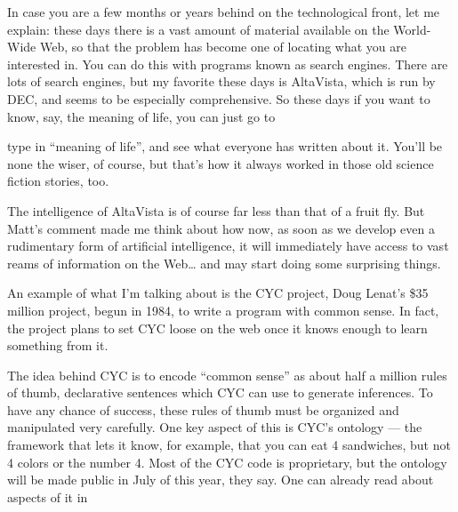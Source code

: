 \documentclass{article}
\def\tightlist{}
\renewcommand{\texttt}[1]{%
  \begingroup
  \ttfamily
  \begingroup\lccode`~=`/\lowercase{\endgroup\def~}{/\discretionary{}{}{}}%
  \begingroup\lccode`~=`[\lowercase{\endgroup\def~}{[\discretionary{}{}{}}%
  \begingroup\lccode`~=`.\lowercase{\endgroup\def~}{.\discretionary{}{}{}}%
  \catcode`/=\active\catcode`[=\active\catcode`.=\active
  \scantokens{#1\noexpand}%
  \endgroup
}
\begin{document}
In case you are a few months or years behind on the technological front,
let me explain: these days there is a vast amount of material available
on the World-Wide Web, so that the problem has become one of locating
what you are interested in. You can do this with programs known as
search engines. There are lots of search engines, but my favorite these
days is AltaVista, which is run by DEC, and seems to be especially
comprehensive. So these days if you want to know, say, the meaning of
life, you can just go to


type in ``meaning of life'', and see what everyone has written about it.
You'll be none the wiser, of course, but that's how it always worked in
those old science fiction stories, too.

The intelligence of AltaVista is of course far less than that of a fruit
fly. But Matt's comment made me think about how now, as soon as we
develop even a rudimentary form of artificial intelligence, it will
immediately have access to vast reams of information on the Web\ldots{}
and may start doing some surprising things.

An example of what I'm talking about is the CYC project, Doug Lenat's
\$35 million project, begun in 1984, to write a program with common
sense. In fact, the project plans to set CYC loose on the web once it
knows enough to learn something from it.


The idea behind CYC is to encode ``common sense'' as about half a
million rules of thumb, declarative sentences which CYC can use to
generate inferences. To have any chance of success, these rules of thumb
must be organized and manipulated very carefully. One key aspect of this
is CYC's ontology --- the framework that lets it know, for example, that
you can eat 4 sandwiches, but not 4 colors or the number 4. Most of the
CYC code is proprietary, but the ontology will be made public in July of
this year, they say. One can already read about aspects of it in
\end{document}
